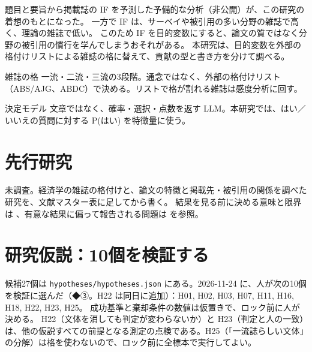 \documentclass[a4paper,10pt]{ltjsarticle}
\begin{document}
題目と要旨から掲載誌の IF を予測した予備的な分析（非公開）が、この研究の着想のもとになった。
一方で IF は、サーベイや被引用の多い分野の雑誌で高く、理論の雑誌で低い。
このため IF を目的変数にすると、論文の質ではなく分野の被引用の慣行を学んでしまうおそれがある。
本研究は、目的変数を外部の格付けリストによる雑誌の格に替えて、貢献の型と書き方を分けて調べる。

\begin{term}{雑誌の格}
一流・二流・三流の3段階。通念ではなく、外部の格付けリスト（ABS/AJG、ABDC）で決める。リストで格が割れる雑誌は感度分析に回す。
\end{term}

\begin{term}{決定モデル}
文章ではなく、確率・選択・点数を返す LLM。本研究では、はい／いいえの質問に対する P(はい) を特徴量に使う。
\end{term}

\section{先行研究}\label{sec:prior}
未調査。経済学の雑誌の格付けと、論文の特徴と掲載先・被引用の関係を調べた研究を、文献マスター表に足してから書く。
結果を見る前に決める意味と限界は \textcite{olken2015}、有意な結果に偏って報告される問題は \textcite{brodeur2020} を参照。

\section{研究仮説：10個を検証する}\label{sec:hyp}
候補27個は \texttt{hypotheses/hypotheses.json} にある。2026-11-24 に、人が次の10個を検証に選んだ（◆③。H22 は同日に追加）：H01, H02, H03, H07, H11, H16, H18, H22, H23, H25。
成功基準と棄却条件の数値は仮置きで、ロック前に人が決める。
H22（文体を消しても判定が変わらないか）と H23（判定と人の一致）は、他の仮説すべての前提となる測定の点検である。H25（「一流誌らしい文体」の分解）は格を使わないので、ロック前に全標本で実行してよい。
\end{document}

